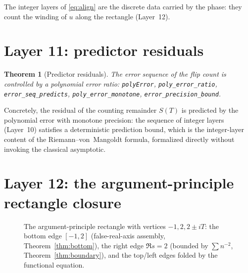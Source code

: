 \documentclass{article}
\newtheorem{theorem}{Theorem}[section]
\newcommand{\GG}{\Gamma}
\begin{document}
The integer layers of \eqref{eq:align} are the discrete data carried by the
phase: they count the winding of $u$ along the rectangle (Layer~12).

\section{Layer 11: predictor residuals}
\label{sec:L11}

\begin{theorem}[Predictor residuals]
\label{thm:residual}
The error sequence of the flip count is controlled by a polynomial error
ratio: \texttt{polyError}, \texttt{poly\_error\_ratio},
\texttt{error\_seq\_predicts}, \texttt{poly\_error\_monotone},
\texttt{error\_precision\_bound}.
\end{theorem}

Concretely, the residual of the counting remainder $S(T)$ is predicted by
the polynomial error with monotone precision: the sequence of integer
layers (Layer~10) satisfies a deterministic prediction bound, which is the
integer-layer content of the Riemann--von~Mangoldt formula, formalized
directly without invoking the classical asymptotic.

\section{Layer 12: the argument-principle rectangle closure}
\label{sec:L12}

\begin{figure}[h]
\centering
{}
\caption{The argument-principle rectangle with vertices $-1,2,2\pm iT$:
the bottom edge $[-1,2]$ (false-real-axis assembly, Theorem~\ref{thm:bottom}),
the right edge $\Re s=2$ (bounded by $\sum n^{-2}$,
Theorem~\ref{thm:boundary}), and the top/left edges folded by the
functional equation.}
\label{fig:rect}
\end{figure}
\end{document}
